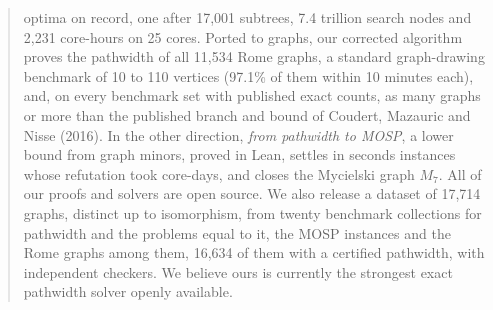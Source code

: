 \documentclass[11pt,letterpaper]{article}
\numberwithin{figure}{section}
\numberwithin{table}{section}
\theoremstyle{plain}
\theoremstyle{definition}
\theoremstyle{remark}
\begin{document}
\begin{abstract}
optima on record, one after 17,001 subtrees, 7.4 trillion search nodes and 2,231 core-hours on 25 cores. Ported to graphs, our corrected algorithm proves the pathwidth of all 11,534
Rome graphs, a standard graph-drawing benchmark of 10 to 110 vertices (97.1\% of them within 10 minutes each), and, on every benchmark set with published
exact counts, as many graphs or more than the published branch and bound of
Coudert, Mazauric and Nisse (2016). In the other direction, \emph{from pathwidth to MOSP}, a lower bound from graph
minors, proved in Lean, settles in seconds instances whose refutation took
core-days, and closes the Mycielski graph $M_7$. All of our proofs and solvers are open source.
We also release a dataset of 17,714 graphs, distinct up to isomorphism, from
twenty benchmark collections for pathwidth and the problems equal to it, the
MOSP instances and the Rome graphs among them, 16,634 of them with a certified
pathwidth, with independent checkers. We believe ours is currently the
strongest exact pathwidth solver openly available.
\end{abstract}

\clearpage
\setcounter{tocdepth}{2}
{\small\tableofcontents}
\clearpage












\begin{appendices}
\clearpage
\clearpage
\clearpage
\clearpage
\clearpage
\clearpage
\clearpage
\end{appendices}
\end{document}
